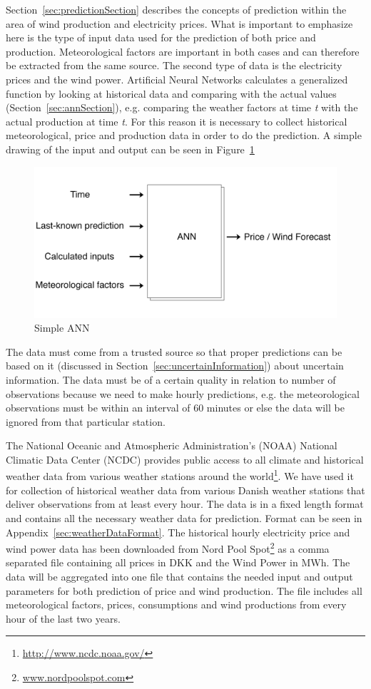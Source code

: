 Section~\ref{sec:predictionSection} describes the concepts of prediction within the area of wind production and electricity prices. What is important to emphasize here is the type of input data used for the prediction of both price and production. Meteorological factors are important in both cases and can therefore be extracted from the same source. The second type of data is the electricity prices and the wind power. Artificial Neural Networks calculates a generalized function by looking at historical data and comparing with the actual values (Section~\ref{sec:annSection}), e.g. comparing the weather factors at time \emph{t} with the actual production at time \emph{t}. For this reason it is necessary to collect historical meteorological, price and production data in order to do the prediction. A simple drawing of the input and output can be seen in Figure~\ref{fig:verySimpleANN}

\begin{figure}[H]
\centering
\includegraphics[width=0.85\linewidth]{billeder/simpleANN.png}
\caption{Simple ANN}
\label{fig:verySimpleANN}
\end{figure}

The data must come from a trusted source so that proper predictions can be based on it (discussed in Section~\ref{sec:uncertainInformation}) about uncertain information. The data must be of a certain quality in relation to number of observations because we need to make hourly predictions, e.g. the meteorological observations must be within an interval of 60 minutes or else the data will be ignored from that particular station.

The National Oceanic and Atmospheric Administration's (NOAA) National Climatic Data Center (NCDC) provides public access to all climate and historical weather data from various weather stations around the world\footnote{\url{http://www.ncdc.noaa.gov/}}. We have used it for collection of historical weather data from various Danish weather stations that deliver observations from at least every hour. The data is in a fixed length format and contains all the necessary weather data for prediction. Format can be seen in Appendix~\ref{sec:weatherDataFormat}. 
The historical hourly electricity price and wind power data has been downloaded from Nord Pool Spot\footnote{\url{www.nordpoolspot.com}} as a comma separated file containing all prices in DKK and the Wind Power in MWh.
The data will be aggregated into one file that contains the needed input and output parameters for both prediction of price and wind production. The file includes all meteorological factors, prices, consumptions and wind productions from every hour of the last two years. 

